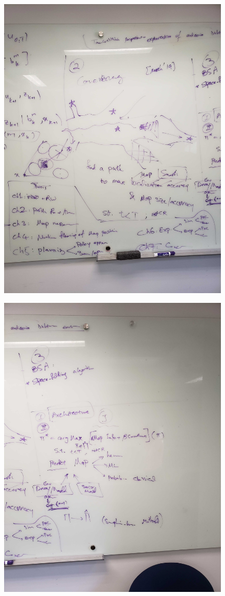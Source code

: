 \documentclass[letterpaper, 10 pt, conference]{ieeeconf}  %
\begin{document}
\begin{figure}[H]
  \centering
  \includegraphics[width=.5\textwidth]{figures/whiteboard3.jpg}
  \label{fig:whiteboard1}
\end{figure}

\begin{figure}[H]
  \centering
  \includegraphics[width=.5\textwidth]{figures/whiteboard4.jpg}
  \label{fig:whiteboard1}
\end{figure}
\end{document}
